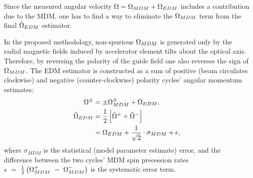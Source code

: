 Since the measured angular velocity $\Omega = \Omega_{MDM} + \Omega_{EDM}$ includes a contribution due to the MDM, one has to find a way to eliminate the $\Omega_{MDM}$ term from the final $\hat{\Omega}_{EDM}$ estimator. 

In the proposed methodology, non-spurious $\Omega_{MDM}$ is generated only by the radial magnetic fields induced by accelerator element tilts about the optical axis. Therefore, by reversing the polarity of the guide field one also reverses the sign of $\Omega_{MDM}$. The EDM estimator is constructed as a sum of positive (beam circulates clockwise) and negative (counter-clockwise) polarity cycles' angular momentum estimates:
\begin{align}
	\Omega^{\pm} &= \pm \Omega_{MDM}^\pm + \Omega_{EDM},\\
	\hat{\Omega}_{EDM} &= \frac12\left[\hat{\Omega}^+ + \hat{\Omega}^-\right] \notag\\
	&= \Omega_{EDM} + \frac{1}{\sqrt{2}}\cdot\sigma_{MDM} + \epsilon,	\label{eq:EDM-estimator}
\end{align}
where
$\sigma_{MDM}$ is  the statistical (model parameter estimate) error, and the difference between the two cycles' MDM spin precession rates $\epsilon~=~\frac12\left(\Omega_{MDM}^+~-~\Omega_{MDM}^-\right)$ is the  systematic error term.